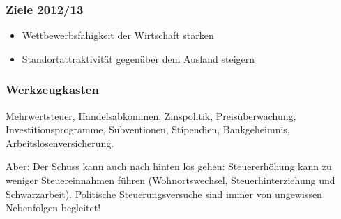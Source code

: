 \subsubsection{Ziele 2012/13}
\begin{itemize}\itemsep0em
	\item Wettbewerbsfähigkeit der Wirtschaft stärken
	\item Standortattraktivität gegenüber dem Ausland steigern
\end{itemize}

\subsubsection{Werkzeugkasten}
Mehrwertsteuer, Handelsabkommen, Zinspolitik, Preisüberwachung, Investitionsprogramme,
Subventionen, Stipendien, Bankgeheimnis, Arbeitslosenversicherung.

Aber: Der Schuss kann auch nach hinten los gehen: Steuererhöhung kann zu weniger Steuereinnahmen führen
(Wohnortswechsel, Steuerhinterziehung und Schwarzarbeit). Politische Steuerungsversuche sind immer von
 ungewissen Nebenfolgen begleitet!

